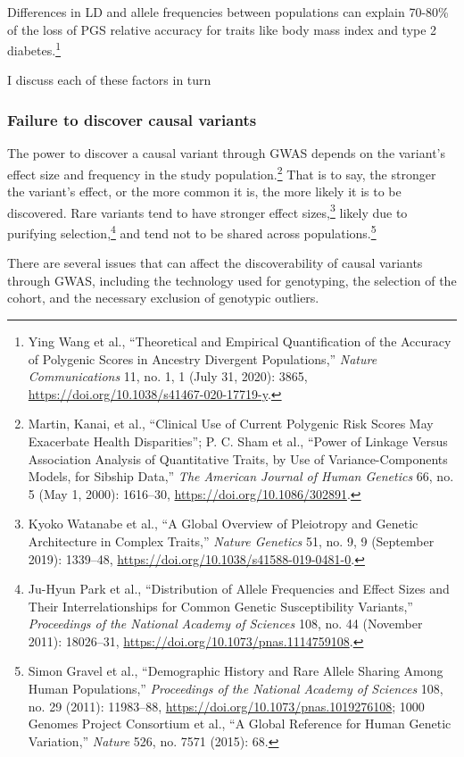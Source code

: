 \documentclass[
]{book}
\begin{document}
Differences in LD and allele frequencies between populations can explain 70-80\% of the loss of PGS relative accuracy for traits like body mass index and type 2 diabetes.\footnote{Ying Wang et al., {``Theoretical and Empirical Quantification of the Accuracy of Polygenic Scores in Ancestry Divergent Populations,''} \emph{Nature Communications} 11, no. 1, 1 (July 31, 2020): 3865, \url{https://doi.org/10.1038/s41467-020-17719-y}.}

I discuss each of these factors in turn

\hypertarget{fst-discovery-sec}{%
\subsubsection{Failure to discover causal variants}\label{fst-discovery-sec}}

The power to discover a causal variant through GWAS depends on the variant's effect size and frequency in the study population.\footnote{Martin, Kanai, et al., {``Clinical Use of Current Polygenic Risk Scores May Exacerbate Health Disparities''}; P. C. Sham et al., {``Power of {Linkage} Versus {Association Analysis} of {Quantitative Traits}, by {Use} of {Variance-Components Models}, for {Sibship Data},''} \emph{The American Journal of Human Genetics} 66, no. 5 (May 1, 2000): 1616--30, \url{https://doi.org/10.1086/302891}.} That is to say, the stronger the variant's effect, or the more common it is, the more likely it is to be discovered. Rare variants tend to have stronger effect sizes,\footnote{Kyoko Watanabe et al., {``A Global Overview of Pleiotropy and Genetic Architecture in Complex Traits,''} \emph{Nature Genetics} 51, no. 9, 9 (September 2019): 1339--48, \url{https://doi.org/10.1038/s41588-019-0481-0}.} likely due to purifying selection,\footnote{Ju-Hyun Park et al., {``Distribution of Allele Frequencies and Effect Sizes and Their Interrelationships for Common Genetic Susceptibility Variants,''} \emph{Proceedings of the National Academy of Sciences} 108, no. 44 (November 2011): 18026--31, \url{https://doi.org/10.1073/pnas.1114759108}.} and tend not to be shared across populations.\footnote{Simon Gravel et al., {``Demographic History and Rare Allele Sharing Among Human Populations,''} \emph{Proceedings of the National Academy of Sciences} 108, no. 29 (2011): 11983--88, \url{https://doi.org/10.1073/pnas.1019276108}; 1000 Genomes Project Consortium et al., {``A Global Reference for Human Genetic Variation,''} \emph{Nature} 526, no. 7571 (2015): 68.}

There are several issues that can affect the discoverability of causal variants through GWAS, including the technology used for genotyping, the selection of the cohort, and the necessary exclusion of genotypic outliers.
\end{document}

